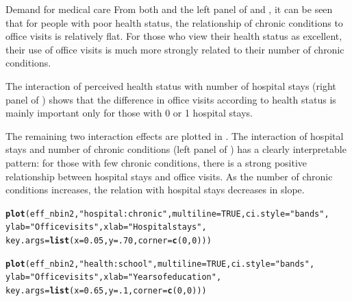 \documentclass[11pt]{book}\usepackage[]{graphicx}\usepackage[]{color}
\makeatletter
\newcommand{\hlnum}[1]{\textcolor[rgb]{0.686,0.059,0.569}{#1}}%
\newcommand{\hlstr}[1]{\textcolor[rgb]{0.192,0.494,0.8}{#1}}%
\newcommand{\hlstd}[1]{\textcolor[rgb]{0.345,0.345,0.345}{#1}}%
\newcommand{\hlkwc}[1]{\textcolor[rgb]{0.333,0.667,0.333}{#1}}%
\newcommand{\hlkwd}[1]{\textcolor[rgb]{0.737,0.353,0.396}{\textbf{#1}}}%
\newenvironment{kframe}{%
 \def\at@end@of@kframe{}%
 \ifinner\ifhmode%
  \def\at@end@of@kframe{\end{minipage}}%
  \begin{minipage}{\columnwidth}%
 \fi\fi%
 \def\FrameCommand##1{\hskip\@totalleftmargin \hskip-\fboxsep
 \colorbox{shadecolor}{##1}\hskip-\fboxsep
     \hskip-\linewidth \hskip-\@totalleftmargin \hskip\columnwidth}%
 \MakeFramed {\advance\hsize-\width
   \@totalleftmargin\z@ \linewidth\hsize
   \@setminipage}}%
 {\par\unskip\endMakeFramed%
 \at@end@of@kframe}
\newenvironment{knitrout}{}{} %
\renewenvironment{knitrout}{\small\renewcommand{\baselinestretch}{.85}}{} %
\makeatother
\begin{document}
\begin{Example}[nmes2a]{Demand for medical care}
From both  and the left panel of
and , it can be seen that for people with poor health
status, the relationship of chronic conditions to office visits is
relatively flat. For those who view their health status as excellent,
their use of office visits is much more strongly related to their number
of chronic conditions.

The interaction of perceived health status with number of
hospital stays (right panel of ) shows that
the difference in office visits according to health status is mainly
important only for those with 0 or 1 hospital stays.

The remaining two interaction effects are plotted in .
The interaction of hospital stays and number of chronic
conditions (left panel of )
has a clearly interpretable pattern: for those with few
chronic conditions, there is a strong positive relationship between
hospital stays and office visits. As the number of chronic conditions
increases, the relation with hospital stays decreases in slope.

\begin{knitrout}
\color{fgcolor}\begin{kframe}
\begin{alltt}
\hlkwd{plot}\hlstd{(eff_nbin2,} \hlstr{"hospital:chronic"}\hlstd{,} \hlkwc{multiline}\hlstd{=}\hlnum{TRUE}\hlstd{,} \hlkwc{ci.style}\hlstd{=}\hlstr{"bands"}\hlstd{,}
     \hlkwc{ylab} \hlstd{=} \hlstr{"Office visits"}\hlstd{,} \hlkwc{xlab}\hlstd{=}\hlstr{"Hospital stays"}\hlstd{,}
     \hlkwc{key.args} \hlstd{=} \hlkwd{list}\hlstd{(}\hlkwc{x} \hlstd{=} \hlnum{0.05}\hlstd{,} \hlkwc{y} \hlstd{=} \hlnum{.70}\hlstd{,} \hlkwc{corner} \hlstd{=} \hlkwd{c}\hlstd{(}\hlnum{0}\hlstd{,} \hlnum{0}\hlstd{)))}

\hlkwd{plot}\hlstd{(eff_nbin2,} \hlstr{"health:school"}\hlstd{,} \hlkwc{multiline}\hlstd{=}\hlnum{TRUE}\hlstd{,}  \hlkwc{ci.style}\hlstd{=}\hlstr{"bands"}\hlstd{,}
     \hlkwc{ylab} \hlstd{=} \hlstr{"Office visits"}\hlstd{,} \hlkwc{xlab}\hlstd{=}\hlstr{"Years of education"}\hlstd{,}
     \hlkwc{key.args} \hlstd{=} \hlkwd{list}\hlstd{(}\hlkwc{x} \hlstd{=} \hlnum{0.65}\hlstd{,} \hlkwc{y} \hlstd{=} \hlnum{.1}\hlstd{,} \hlkwc{corner} \hlstd{=} \hlkwd{c}\hlstd{(}\hlnum{0}\hlstd{,} \hlnum{0}\hlstd{)))}
\end{alltt}
\end{kframe}\begin{figure}[!htbp]



\end{figure}
\end{knitrout}
\end{Example}
\end{document}
